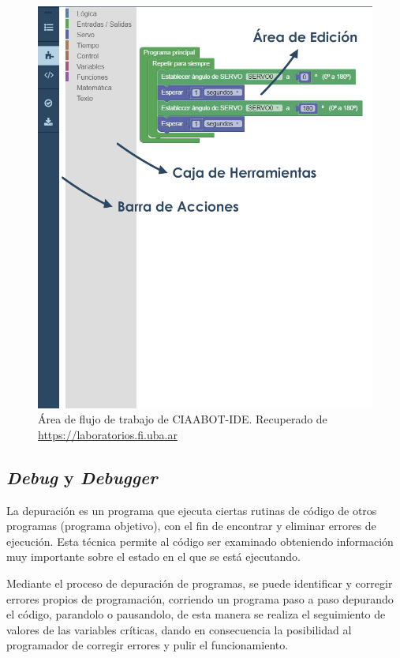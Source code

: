 \begin{figure}[h]
	\centering
	\includegraphics[scale=.50]{./Figures/editor.jpg}
	\caption{Área de flujo de trabajo de CIAABOT-IDE. Recuperado de \url{https://laboratorios.fi.uba.ar}}
	\label{fig:editor}
\end{figure}

\subsection{\emph{Debug} y \emph{Debugger}}
\label{Debug y Debugger}

La depuración es un programa que ejecuta ciertas rutinas de código de otros programas (programa objetivo), con el fin de encontrar y eliminar errores de ejecución. Esta técnica permite al código ser examinado obteniendo información muy importante sobre el estado en el que se está ejecutando.

Mediante el proceso de depuración de programas, se puede identificar y corregir errores propios de programación, corriendo un programa paso a paso depurando
el código, parandolo o pausandolo, de esta manera se realiza el seguimiento de
valores de las variables críticas, dando en consecuencia la posibilidad al programador
de corregir errores y pulir el funcionamiento.

